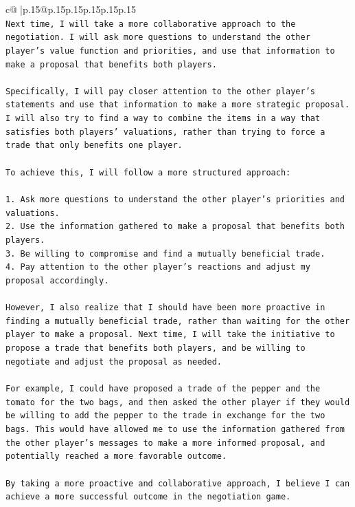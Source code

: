 \documentclass{article}
\begin{document}
{\begin{supertabular}{c@{$\;$}|p{.15\linewidth}@{}p{.15\linewidth}p{.15\linewidth}p{.15\linewidth}p{.15\linewidth}p{.15\linewidth}}
{{{\\ 
\texttt{Next time, I will take a more collaborative approach to the negotiation. I will ask more questions to understand the other player's value function and priorities, and use that information to make a proposal that benefits both players.} \\
\\ 
\texttt{Specifically, I will pay closer attention to the other player's statements and use that information to make a more strategic proposal. I will also try to find a way to combine the items in a way that satisfies both players' valuations, rather than trying to force a trade that only benefits one player.} \\
\\ 
\texttt{To achieve this, I will follow a more structured approach:} \\
\\ 
\texttt{1. Ask more questions to understand the other player's priorities and valuations.} \\
\texttt{2. Use the information gathered to make a proposal that benefits both players.} \\
\texttt{3. Be willing to compromise and find a mutually beneficial trade.} \\
\texttt{4. Pay attention to the other player's reactions and adjust my proposal accordingly.} \\
\\ 
\texttt{However, I also realize that I should have been more proactive in finding a mutually beneficial trade, rather than waiting for the other player to make a proposal. Next time, I will take the initiative to propose a trade that benefits both players, and be willing to negotiate and adjust the proposal as needed.} \\
\\ 
\texttt{For example, I could have proposed a trade of the pepper and the tomato for the two bags, and then asked the other player if they would be willing to add the pepper to the trade in exchange for the two bags. This would have allowed me to use the information gathered from the other player's messages to make a more informed proposal, and potentially reached a more favorable outcome.} \\
\\ 
\texttt{By taking a more proactive and collaborative approach, I believe I can achieve a more successful outcome in the negotiation game.} \\
\\ 
}}}
\end{supertabular}}
\end{document}
